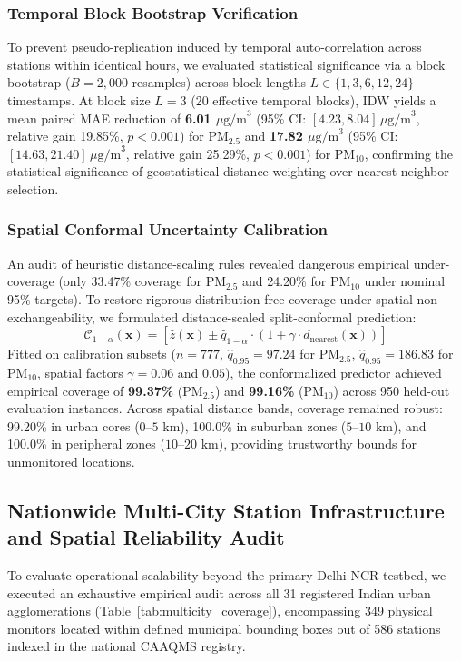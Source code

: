 \documentclass[conference]{IEEEtran}
\begin{document}
\subsubsection{Temporal Block Bootstrap Verification}
To prevent pseudo-replication induced by temporal auto-correlation across stations within identical hours, we evaluated statistical significance via a block bootstrap ($B = 2,000$ resamples) across block lengths $L \in \{1, 3, 6, 12, 24\}$ timestamps. At block size $L=3$ (20 effective temporal blocks), IDW yields a mean paired MAE reduction of \textbf{6.01 $\mu\text{g/m}^3$} (95\% CI: $[4.23, 8.04]\,\mu\text{g/m}^3$, relative gain 19.85\%, $p < 0.001$) for $\text{PM}_{2.5}$ and \textbf{17.82 $\mu\text{g/m}^3$} (95\% CI: $[14.63, 21.40]\,\mu\text{g/m}^3$, relative gain 25.29\%, $p < 0.001$) for $\text{PM}_{10}$, confirming the statistical significance of geostatistical distance weighting over nearest-neighbor selection.

\subsubsection{Spatial Conformal Uncertainty Calibration}
An audit of heuristic distance-scaling rules revealed dangerous empirical under-coverage (only 33.47\% coverage for $\text{PM}_{2.5}$ and 24.20\% for $\text{PM}_{10}$ under nominal 95\% targets). To restore rigorous distribution-free coverage under spatial non-exchangeability, we formulated distance-scaled split-conformal prediction:
\begin{equation}
\mathcal{C}_{1-\alpha}(\mathbf{x}) = \left[\hat{z}(\mathbf{x}) \pm \hat{q}_{1-\alpha} \cdot (1 + \gamma \cdot d_{\text{nearest}}(\mathbf{x}))\right]
\end{equation}
Fitted on calibration subsets ($n=777$, $\hat{q}_{0.95} = 97.24$ for $\text{PM}_{2.5}$, $\hat{q}_{0.95} = 186.83$ for $\text{PM}_{10}$, spatial factors $\gamma = 0.06$ and $0.05$), the conformalized predictor achieved empirical coverage of \textbf{99.37\%} ($\text{PM}_{2.5}$) and \textbf{99.16\%} ($\text{PM}_{10}$) across 950 held-out evaluation instances. Across spatial distance bands, coverage remained robust: 99.20\% in urban cores ($0$--$5\text{ km}$), 100.0\% in suburban zones ($5$--$10\text{ km}$), and 100.0\% in peripheral zones ($10$--$20\text{ km}$), providing trustworthy bounds for unmonitored locations.

\subsection{Nationwide Multi-City Station Infrastructure and Spatial Reliability Audit}
\label{sec:multicity_audit}
To evaluate operational scalability beyond the primary Delhi NCR testbed, we executed an exhaustive empirical audit across all 31 registered Indian urban agglomerations (Table~\ref{tab:multicity_coverage}), encompassing 349 physical monitors located within defined municipal bounding boxes out of 586 stations indexed in the national CAAQMS registry.
\end{document}
